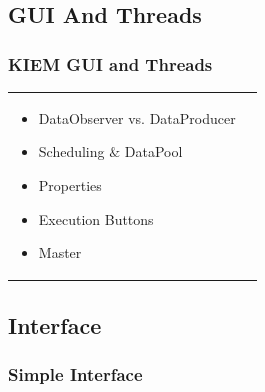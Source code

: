 \subsection[GUI And Threads]{GUI And Threads}
\begin{frame}
  \frametitle{KIEM GUI and Threads}
  			\begin{tabular}[h]{l r}
			   \parbox{0.56\textwidth}{
			}
   			\parbox{0.44\textwidth}{   
\begin{itemize}
	\item DataObserver vs. DataProducer
	\pause
	\item Scheduling $\&$ DataPool
	\pause
	\item Properties
	\pause
	\item Execution Buttons
	\pause
	\item Master
\end{itemize}
}
		\end{tabular}	

  \end{frame}


\subsection[Interface]{Interface}
\begin{frame}
  \frametitle{Simple Interface}
  \begin{center} 
				\listingjava {} 
  \end{center}
\end{frame}

